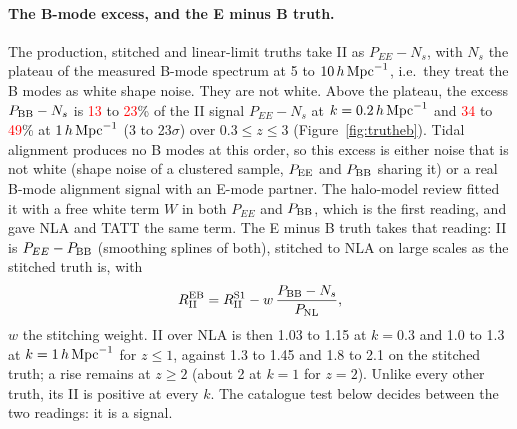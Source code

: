 \documentclass[11pt]{article}
\newcommand{\hMpc}{\,h\,{\rm Mpc}^{-1}}
\newcommand{\PNL}{P_{\rm NL}}
\newcommand{\PEE}{P_{EE}}
\newif\ifnumbersfinal
\newcommand{\refresh}[1]{\ifnumbersfinal#1\else\textcolor{red}{#1}\fi}
\newcommand{\EBfracTwoLo}{\refresh{13}}
\newcommand{\EBfracTwoHi}{\refresh{23}}
\newcommand{\EBfracOneLo}{\refresh{34}}
\newcommand{\EBfracOneHi}{\refresh{49}}
\begin{document}
\paragraph{The B-mode excess, and the E minus B truth.}
The production, stitched and linear-limit truths take II as $\PEE - N_s$,
with $N_s$ the plateau of the measured B-mode spectrum at 5 to $10\hMpc$,
i.e.\ they treat the B modes as white shape noise. They are not white. Above
the plateau, the excess $P_{\rm BB} - N_s$ is \EBfracTwoLo{} to
\EBfracTwoHi\% of the II signal $\PEE - N_s$ at $k = 0.2\hMpc$ and
\EBfracOneLo{} to \EBfracOneHi\% at $1\hMpc$ (3 to 23$\sigma$)
over $0.3 \le z \le 3$ (Figure~\ref{fig:trutheb}). Tidal alignment produces no B modes
at this order, so this excess is either noise that is not white (shape noise
of a clustered sample, $P_{\rm EE}$ and $P_{\rm BB}$ sharing it) or a real
B-mode alignment signal with an E-mode partner. The halo-model review fitted
it with a free white term $W$ in both $\PEE$ and $P_{\rm BB}$, which is
the first reading, and gave NLA and TATT the same term. The E minus B
truth takes that reading: II is $\PEE - P_{\rm BB}$ (smoothing splines of
both), stitched to NLA on large scales as the stitched truth is, with
\begin{equation}
  R_{\rm II}^{\rm EB} = R_{\rm II}^{\rm S1} - w\,\frac{P_{\rm BB} - N_s}{\PNL},
\end{equation}
$w$ the stitching weight. II over NLA is then 1.03 to 1.15 at $k = 0.3$ and
1.0 to 1.3 at $k = 1\hMpc$ for $z \le 1$, against 1.3 to 1.45 and 1.8 to 2.1
on the stitched truth; a rise remains at $z \ge 2$ (about 2 at $k = 1$ for
$z = 2$). Unlike every other truth, its II is positive at every $k$. The
catalogue test below decides between the two readings: it is a signal.
\end{document}
